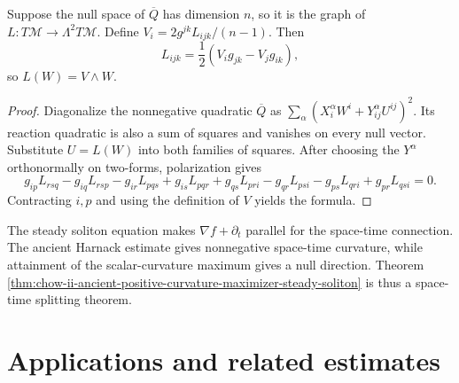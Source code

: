 \begin{lemma}
\label{lem:chow-ii-nullspace-map-is-wedge-map}
Suppose the null space of \(\overline Q\) has dimension \(n\), so it is the
graph of \(L:T\mathcal M\to\Lambda^2T\mathcal M\).  Define
\(V_i=2g^{jk}L_{ijk}/(n-1)\).  Then
\[
L_{ijk}=\frac12(V_ig_{jk}-V_jg_{ik}),
\]
so \(L(W)=V\wedge W\).
\end{lemma}
\begin{proof}
\sketch Diagonalize the nonnegative quadratic \(\overline Q\) as
\(\sum_\alpha(X_i^\alpha W^i+Y_{ij}^\alpha U^{ij})^2\).  Its reaction
quadratic is also a sum of squares and vanishes on every null vector.
Substitute \(U=L(W)\) into both families of squares.  After choosing the
\(Y^\alpha\) orthonormally on two-forms, polarization gives
\[
g_{ip}L_{rsq}-g_{iq}L_{rsp}-g_{ir}L_{pqs}+g_{is}L_{pqr}
+g_{qs}L_{pri}-g_{qr}L_{psi}-g_{ps}L_{qri}+g_{pr}L_{qsi}=0.
\]
Contracting \(i,p\) and using the definition of \(V\) yields the formula.
\end{proof}

\begin{remark}
\label{rem:chow-ii-ancient-rigidity-spacetime-splitting}
The steady soliton equation makes \(\nabla f+\partial_t\) parallel for the
space-time connection.  The ancient Harnack estimate gives nonnegative
space-time curvature, while attainment of the scalar-curvature maximum gives
a null direction.  Theorem
\ref{thm:chow-ii-ancient-positive-curvature-maximizer-steady-soliton} is thus a
space-time splitting theorem.
\end{remark}

\section{Applications and related estimates}

